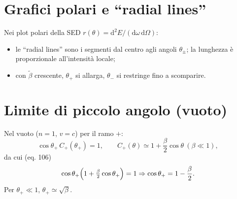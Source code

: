 \documentclass[11pt,a4paper]{article}
\newcommand{\w}{\omega}
\newcommand{\bbeta}{\tilde{\beta}}          %
\newcommand{\Cplus}{C_{+}}
\newcommand{\dd}{\mathrm{d}}
\begin{document}
\section{Grafici polari e ``radial lines''}
Nei plot polari della SED $r(\theta)=\dd^{2}E/(\dd\w\,\dd\Omega)$:
\begin{itemize}
  \item le ``radial lines'' sono i segmenti dal centro agli angoli $\theta_{\pm}$; la lunghezza è proporzionale all'intensità locale;
  \item con $\bbeta$ crescente, $\theta_{+}$ si allarga, $\theta_{-}$ si restringe fino a scomparire.
\end{itemize}

\section{Limite di piccolo angolo (vuoto)}
Nel vuoto ($n=1$, $v=c$) per il ramo $+$:
\begin{equation}
\cos\theta_{+}\,\Cplus(\theta_{+})=1,\qquad \Cplus(\theta)\simeq 1+\frac{\beta}{2}\cos\theta \ (\beta\ll1),
\end{equation}
da cui (eq. 106)
\begin{equation}
\cos\theta_{+}\Bigl(1+\tfrac{\beta}{2}\cos\theta_{+}\Bigr)=1 \Rightarrow \cos\theta_{+}=1-\frac{\beta}{2}.
\end{equation}
Per $\theta_{+}\ll1$, $\theta_{+}\simeq \sqrt{\beta}$.
\end{document}
